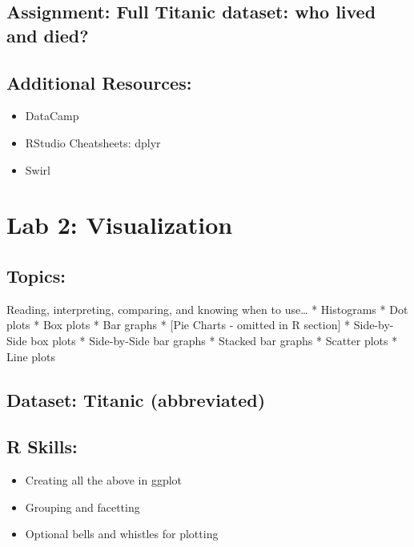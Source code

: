 \documentclass[]{article}
\providecommand{\tightlist}{%
  \setlength{\itemsep}{0pt}\setlength{\parskip}{0pt}}
\begin{document}
\subsection{Assignment: Full Titanic dataset: who lived and
died?}\label{assignment-full-titanic-dataset-who-lived-and-died}

\subsection{Additional Resources:}\label{additional-resources}

\begin{itemize}
\tightlist
\item
  DataCamp
\item
  RStudio Cheatsheets: dplyr
\item
  Swirl
\end{itemize}

\section{Lab 2: Visualization}\label{lab-2-visualization}

\subsection{Topics:}\label{topics-1}

Reading, interpreting, comparing, and knowing when to use\ldots{} *
Histograms * Dot plots * Box plots * Bar graphs * {[}Pie Charts -
omitted in R section{]} * Side-by-Side box plots * Side-by-Side bar
graphs * Stacked bar graphs * Scatter plots * Line plots

\subsection{Dataset: Titanic
(abbreviated)}\label{dataset-titanic-abbreviated}

\subsection{R Skills:}\label{r-skills-1}

\begin{itemize}
\tightlist
\item
  Creating all the above in ggplot
\item
  Grouping and facetting
\item
  Optional bells and whistles for plotting
\end{itemize}
\end{document}
